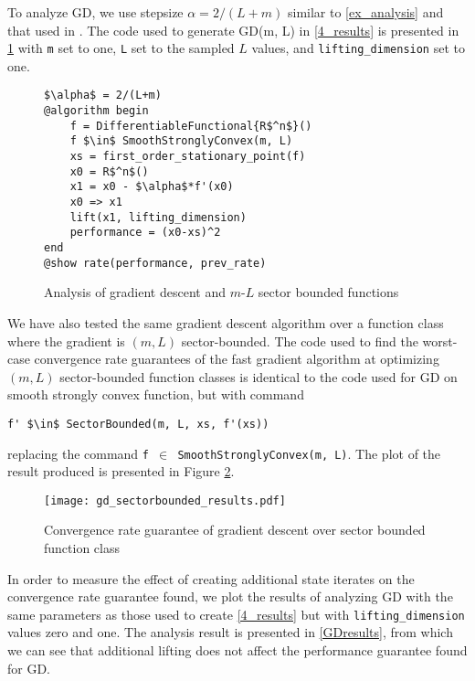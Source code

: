 To analyze GD, we use stepsize $\alpha = 2/(L+m)$ similar to \cref{ex_analysis} and that used in \cite{tutorial}. The code used to generate GD(m, L) in \cref{4_results} is presented in \cref{gd_code} with \texttt{m} set to one, \texttt{L} set to the sampled $L$ values, and \texttt{lifting\_dimension} set to one.

\begin{figure}[h!]
	\begin{lstlisting}[mathescape]
$\alpha$ = 2/(L+m)
@algorithm begin    
    f = DifferentiableFunctional{R$^n$}()
    f $\in$ SmoothStronglyConvex(m, L)
    xs = first_order_stationary_point(f)
    x0 = R$^n$()
    x1 = x0 - $\alpha$*f'(x0)
    x0 => x1
    lift(x1, lifting_dimension)
    performance = (x0-xs)^2
end
@show rate(performance, prev_rate)
\end{lstlisting}
\caption{Analysis of gradient descent and $m$-$L$ sector bounded functions}
\label{gd_code}
\end{figure}

We have also tested the same gradient descent algorithm over a function class where the gradient is $(m, L)$ sector-bounded. The code used to find the worst-case convergence rate guarantees of the fast gradient algorithm at optimizing $(m, L)$ sector-bounded function classes is identical to the code used for GD on smooth strongly convex function, but with command
\begin{lstlisting}[mathescape]
    f' $\in$ SectorBounded(m, L, xs, f'(xs))
\end{lstlisting}
replacing the command \texttt{f $\in$ SmoothStronglyConvex(m, L)}. The plot of the result produced is presented in Figure \ref*{gd_sectorbounded_results}.

\begin{figure}[h]
    \centering
    \texttt{[image: gd\_sectorbounded\_results.pdf]}
    \caption{Convergence rate guarantee of gradient descent over sector bounded function class}
    \label{gd_sectorbounded_results}
\end{figure}

In order to measure the effect of creating additional state iterates on the convergence rate guarantee found, we plot the results of analyzing GD with the same parameters as those used to create \cref{4_results} but with \texttt{lifting\_dimension} values zero and one. The analysis result is presented in \cref{GDresults}, from which we can see that additional lifting does not affect the performance guarantee found for GD.

